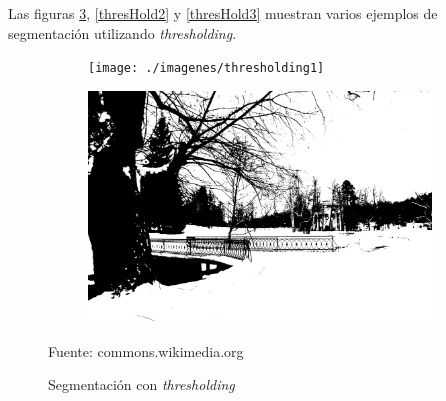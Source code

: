Las figuras \ref{thresHold1}, \ref{thresHold2} y \ref{thresHold3} muestran varios ejemplos de segmentaci\'{o}n utilizando \textit{thresholding}.
\vspace{-2 mm}			
\begin{figure}[H]
	\captionsetup{justification=centering}
	\centering
	\begin{subfigure}[t]{2.5in}
		\centering
		\texttt{[image: ./imagenes/thresholding1]}
		\label{thresholding1}		
	\end{subfigure}
	\begin{subfigure}[t]{2.5in}
		\centering
		\includegraphics[width=.9\textwidth]{./imagenes/thresholding2}
		\label{thresholding2}
	\end{subfigure}
	\caption{Segmentaci\'{o}n con \textit{thresholding}}	
	\vspace{2 mm}			
	Fuente: commons.wikimedia.org	
	\label{thresHold1}
\end{figure}	
